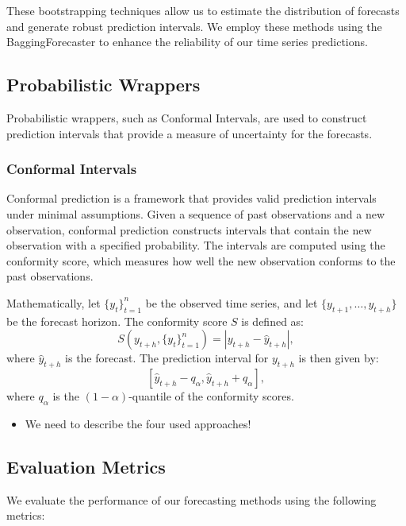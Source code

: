 These bootstrapping techniques allow us to estimate the distribution of forecasts and generate robust prediction intervals. We employ these methods using the BaggingForecaster to enhance the reliability of our time series predictions.


\subsection{Probabilistic Wrappers}
Probabilistic wrappers, such as Conformal Intervals, are used to construct prediction intervals that provide a measure of uncertainty for the forecasts.

\subsubsection{Conformal Intervals}
Conformal prediction is a framework that provides valid prediction intervals under minimal assumptions. Given a sequence of past observations and a new observation, conformal prediction constructs intervals that contain the new observation with a specified probability. The intervals are computed using the conformity score, which measures how well the new observation conforms to the past observations.

Mathematically, let \( \{ y_t \}_{t=1}^n \) be the observed time series, and let \( \{ y_{t+1}, \ldots, y_{t+h} \} \) be the forecast horizon. The conformity score \( S \) is defined as:
\begin{equation}
S(y_{t+h}, \{ y_t \}_{t=1}^n) = | y_{t+h} - \hat{y}_{t+h} |,
\end{equation}
where \( \hat{y}_{t+h} \) is the forecast. The prediction interval for \( y_{t+h} \) is then given by:
\begin{equation}
\left[ \hat{y}_{t+h} - q_\alpha, \hat{y}_{t+h} + q_\alpha \right],
\end{equation}
where \( q_\alpha \) is the \( (1 - \alpha) \)-quantile of the conformity scores. 

\begin{itemize}
    \item We need to describe the four used approaches!
\end{itemize}

\subsection{Evaluation Metrics}
We evaluate the performance of our forecasting methods using the following metrics:

